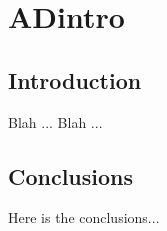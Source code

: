 \chapter{ADintro}
\label{chap:ADintro}

\section{Introduction}

Blah ... Blah \cite{IntraneuronalAbetaSynapsePathology}... 

\section{Conclusions}

Here is the conclusions...


\endinput








